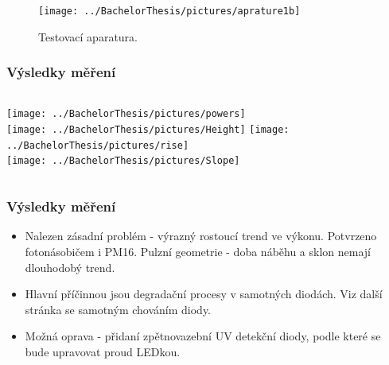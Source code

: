 \documentclass{beamer}
\begin{document}
\begin{frame}




 \begin{figure}[H]
 \centering
 \texttt{[image: ../BachelorThesis/pictures/aprature1b]}
 \caption{Testovací aparatura.}
 \label{UVsource}
\end{figure}


\end{frame}




\begin{frame}
\frametitle{Výsledky měření}
\begin{columns}[t]
\centering
\texttt{[image: ../BachelorThesis/pictures/powers]}\\
\texttt{[image: ../BachelorThesis/pictures/Height]}
\centering
\texttt{[image: ../BachelorThesis/pictures/rise]}\\
\texttt{[image: ../BachelorThesis/pictures/Slope]}
\end{columns}


\end{frame}




\begin{frame}
\frametitle{Výsledky měření}
\begin{itemize}
 \item Nalezen zásadní problém - výrazný rostoucí trend ve výkonu. Potvrzeno fotonásobičem i PM16. Pulzní geometrie - doba náběhu a sklon nemají dlouhodobý trend.
 \item Hlavní příčinnou jsou degradační procesy v samotných diodách. Viz další stránka se samotným chováním diody.
 \item Možná oprava - přidaní zpětnovazební UV detekční diody, podle které se bude upravovat proud LEDkou. 

\end{itemize}


\end{frame}
\end{document}

